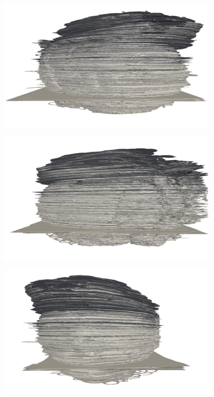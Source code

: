 	\begin{figure}
	  \centering
	  \includegraphics[width=0.9\textheight]{Ch7/Figs/Rat28/contours/whole_positive_x_rigid}
	  \caption{}
	  \label{fig:image1.png}
	\end{figure}

	\begin{figure}
	  \centering
	  \includegraphics[width=0.9\textheight]{Ch7/Figs/Rat28/contours/whole_negative_x_rigid}
	  \caption{}
	  \label{fig:image1.png}
	\end{figure}

	\begin{figure}
	  \centering
	  \includegraphics[width=0.9\textheight]{Ch7/Figs/Rat28/contours/whole_positive_y_rigid}
	  \caption{}
	  \label{fig:image1.png}
	\end{figure}

